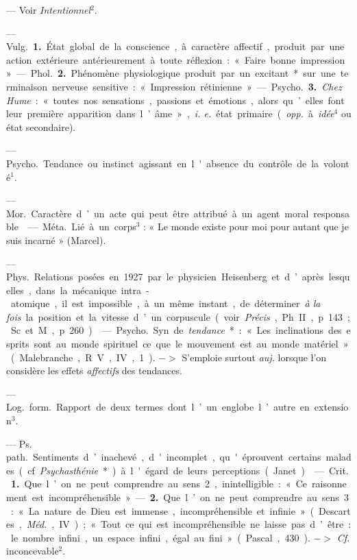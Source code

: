 \begin{itemize}[leftmargin=1cm, label=, itemsep=1pt]
 — Voir {\it Intentionnel}$^2$.

 — \si{Vulg.} {\bf 1.} État global de la conscience, à
caractère affectif, produit par une action extérieure antérieurement à toute
réflexion : « Faire bonne impression ».

— \si{Phol.} {\bf 2.} Phénomène physiologique produit par un excitant* sur
une terminaison nerveuse sensitive : « Impression rétinienne ».

— \si{Psycho.} {\bf 3.} {\it Chez Hume} : « toutes nos sensations, passions
et émotions, alors qu’elles font leur première
apparition dans l’âme », {\it i. e.} état primaire ({\it opp.} à
{\it idée}$^4$ ou état secondaire).

 — \si{Psycho.} Tendance ou instinct agissant en l'absence du
contrôle de la volonté$^1$.

 — \si{Mor.} Caractère d’un acte qui peut être attribué à un
agent moral responsable.

 — \si{Méta.} Lié à un corps$^3$ : « Le monde existe pour moi
pour autant que je suis incarné » (Marcel).

 — \si{Phys.} Relations posées en 1927 par le
physicien Heisenberg et d’après lesquelles, dans la mécanique intra-atomique,
il est impossible, à un même instant, de déterminer {\it à la fois} la
position et la vitesse d’un corpuscule (voir {\it Précis}, Ph. II, p. 143 ;
Sc. et M., p. 260).

 — \si{Psycho.} Syn. de {\it tendance}* : « Les inclinations
des esprits sont au monde spirituel ce que le mouvement est au monde
matériel » (Malebranche, R. V., IV, 1). $->$ S'emploie surtout {\it auj.}
lorsque l’on considère les effets {\it affectifs} des tendances.

 — \si{Log.} \si{form.} Rapport de deux termes dont l’un
englobe l’autre en extension$^3$.

 — \si{Ps. path.} Sentiments d’inachevé,
d'incomplet, qu'éprouvent certains malades (cf. {\it Psychasthénie}*) à
l'égard de leurs perceptions (Janet).

 — \si{Crit.} {\bf 1.} Que l’on ne peut comprendre au
sens 2, inintelligible : « Ce raisonnement est incompréhensible ». — {\bf 2.}
Que l’on ne peut comprendre au sens 3 : « La nature de Dieu est immense,
incompréhensible et infinie » (Descartes,
{\it Méd.}, IV) ; « Tout ce qui est incompréhensible ne laisse pas d’être :
le nombre infini, un espace infini, égal au fini » (Pascal, 430).
$->$ {\it Cf.} inconcevable$^2$.


\end{itemize}
